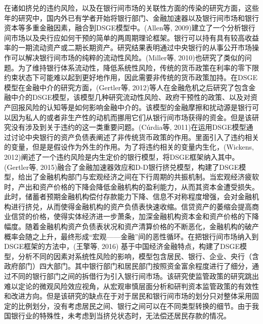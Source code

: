 在诸如挤兑的违约风险，以及在银行间市场的关联性方面的传染的研究方面，这些年的研究中，国内外已有学者开始将银行部门、金融加速器以及银行间市场和银行资本等多重金融因素，融合到DSGE模型中。(Allen等, 2009)建立了一个分析银行间市场以及央行应如何干预的简单的两周期理论框架。银行可以持有具有较高收益率的一期流动资产或二期长期资产。研究结果表明通过中央银行的从事公开市场操作可以解决银行间市场的纯粹的流动性风险。(Miller等, 2010)也研究了类似的问题。为了维持银行体系流动性，降低系统性风险，传统的货币政策在利率的零下限约束状态下可能难以起到更好地作用，因此需要非传统的货币政策加持。在DSGE模型在金融中介的研究方面，(Gertler等, 2012)等人在金融危机之后研究了包含金融中介的DSGE模型，该模型几种研究流动性风险、政府干预性的政策、以及对资产回报风险的认知等是如何影响金融中介的。该模型的金融摩擦和扰动源是银行可以因为私人的或者非生产性的动机而挪用它们从银行间市场获得的资金。但是该研究没有涉及到关于违约的这一类重要问题。(Cúrdia等, 2011)在运用DSGE模型通过讨论中央银行的资产负债表阐述了非传统货币政策的作用。里面引入了违约相关的变量，但是是假设作为外生的作用。为了将违约相关的变量内生化，(Wickens, 2012)阐述了一个违约风险是内生定价的银行模型，将DSGE框架纳入其中。(Gertler等, 2015)融合了金融加速器效应和D-D银行挤兑模型，构建了DSGE模型，给出了金融机构部门与宏观经济之间在下行周期的共振机制。当宏观经济疲软时，产出和资产价格的下降会降低金融机构的盈利能力，从而其资本金遭受损失。此时，储蓄者预期金融机构偿付存款能力下降、信息不对称程度增强，会对金融机构进行挤兑，从而使得金融机构的资产负债表快速收缩。信贷资产的萎缩会提高商业信贷的价格，使得实体经济进一步萧条，加深金融机构资本金和资产价格的下降幅度。随着金融机构资产负债表状况和资产清算价格的不断恶化，金融机构的破产概率会随之上升，最终形成“宏观——金融”间的恶性循环。在把银行间市场纳入到DSGE框架的方法中，(王擎等, 2016) 基于中国经济金融特点，构建了DSGE模型，分析不同的因素对系统性风险的影响，模型包含居民、银行、企业、央行（含政府部门）四大部门。其中银行部门和居民部门按照资金富余程度进行了细分，通过不同的银行部门之间的拆借行为引入银行间市场。该研究使监管政策的研究跳出难以定论的微观风险效应视角，从宏观审慎层面分析和研判资本监管政策的有效性和改进方向。但是该研究的缺点在于对于居民和银行间市场的划分只对整体采用固定的比例划分，没有考虑居民之间、银行之间可以在不同类型转换的细节。由于我国银行业的特殊性，未考虑到当挤兑状态时，无法偿还居民存款的情况。

